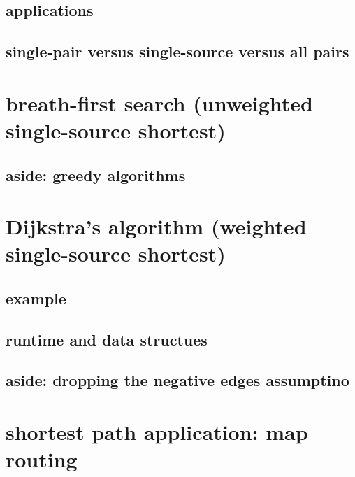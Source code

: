 

\subsection{applications}



\subsection{single-pair versus single-source versus all pairs}



\section{breath-first search (unweighted single-source shortest)}



\subsection{aside: greedy algorithms}


\section{Dijkstra's algorithm (weighted single-source shortest)}



\subsection{example}



\subsection{runtime and data structues}



\subsection{aside: dropping the negative edges assumptino}



\section{shortest path application: map routing} %

